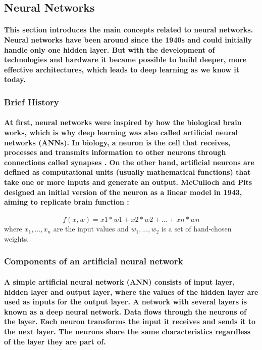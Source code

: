 \subsection{Neural Networks}
\paragraph{
	This section introduces the main concepts related to neural networks. Neural networks have been around since the 1940s and could initially handle only one hidden layer. But with the development of technologies and hardware it became possible to build deeper, more effective architectures, which leads to deep learning as we know it today.
}


\subsubsection{Brief History}
\paragraph{
	At first, neural networks were inspired by how the biological brain works, which is why deep learning was also called artificial neural networks (ANNs)\cite{Goodfellow-et-al-2016}. In biology, a neuron is the cell that receives, processes and transmits information to other neurons through connections called synapses \cite{neuron}. On the other hand, artificial neurons are defined as computational units (usually mathematical functions) that take one or more inputs and generate an output.
	McCulloch and Pits designed an initial version of the neuron as a linear model in 1943, aiming to replicate brain function \cite{REF:11}:
}

\begin{equation}
f(x,w)=x1*w1 +x2*w2 +...+xn*wn
\end{equation}
where $x_1, ..., x_n$ are the input values and $w_1, ..., w_2$ is a set of hand-chosen weights.

\subsubsection{Components of an artificial neural network}
\paragraph{
	A simple artificial neural network (ANN) consists of input layer, hidden layer and output layer, where the values of the hidden layer are used as inputs for the output layer. A network with several layers is known as a deep neural network. Data flows through the neurons of the layer. Each neuron transforms the input it receives and sends it to the next layer. The neurons share the same characteristics regardless of the layer they are part of.
}


